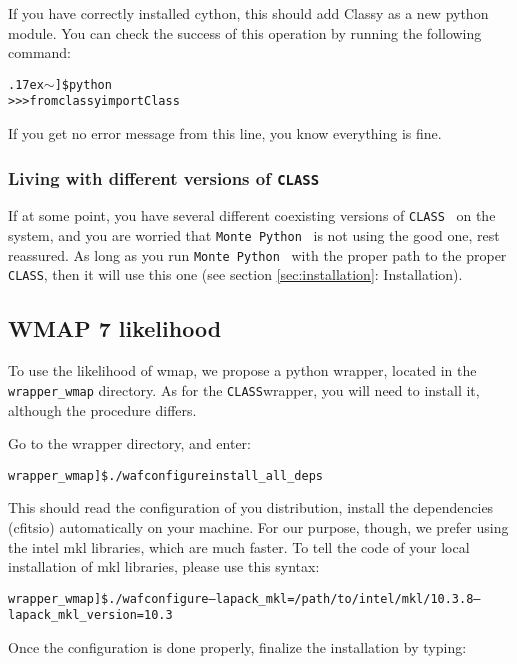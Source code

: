 \documentclass[10pt]{article}
\newcommand{\CLASS}{\texttt{CLASS}}
\newcommand{\MP}{\texttt{Monte Python}}
\newcommand{\tild}{\raise.17ex\hbox{$\scriptstyle\mathtt{\sim}$}}
\begin{document}
  If you have correctly installed cython, this should add Classy as a new python
  module. You can check the success of this operation by running the following
  command:

  \begin{alltt}
    \tild]\$ python
    >>> from classy import Class
  \end{alltt}

  If you get no error message from this line, you know everything is fine.

  \subsubsection*{Living with different versions of \CLASS}

  If at some point, you have several different coexisting versions of \CLASS~
  on the system, and you are worried that \MP~ is not using the good one, rest
  reassured. As long as you run \MP~ with the proper path to the proper \CLASS,
  then it will use this one (see section \ref{sec:installation}: Installation).

  \subsection{WMAP 7 likelihood}

  To use the likelihood of wmap, we propose a python wrapper, located in the
  \verb?wrapper_wmap? directory. As for the \CLASS wrapper, you will need to
  install it, although the procedure differs.

  Go to the wrapper directory, and enter:

  \begin{alltt}
    wrapper_wmap]\$ ./waf configure install_all_deps
  \end{alltt}

  This should read the configuration of you distribution, install the
  dependencies (cfitsio) automatically on your machine. For our purpose,
  though, we prefer using the intel mkl libraries, which are much faster. To
  tell the code of your local installation of mkl libraries, please use this
  syntax:

  \begin{alltt}
    wrapper_wmap]\$ ./waf configure --lapack_mkl=/path/to/intel/mkl/10.3.8 --lapack_mkl_version=10.3
  \end{alltt}

  Once the configuration is done properly, finalize the installation by typing:
  
\end{document}
